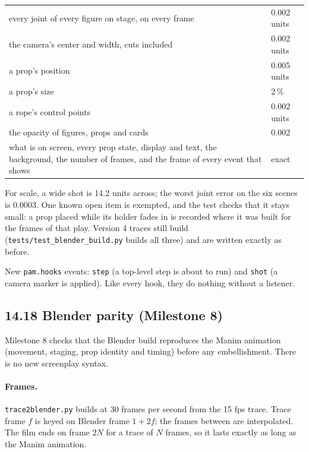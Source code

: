 \documentclass[
  12pt,
  letterpaper,
]{book}
\begin{document}
\begin{center}
\begin{tabular}{p{3.6in}l}
\hline
every joint of every figure on stage, on every frame & 0.002 units \\
the camera's center and width, cuts included & 0.002 units \\
a prop's position & 0.005 units \\
a prop's size & 2\,\% \\
a rope's control points & 0.002 units \\
the opacity of figures, props and cards & 0.002 \\
what is on screen, every prop state, display and text, the background,
the number of frames, and the frame of every event that shows & exact \\
\hline
\end{tabular}
\end{center}

For scale, a wide shot is 14.2 units across; the worst joint error on
the six scenes is 0.0003. One known open item is exempted, and the
test checks that it stays small: a prop placed while its holder fades
in is recorded where it was built for the frames of that play.
Version 4 traces still build (\texttt{tests/test\_blender\_build.py}
builds all three) and are written exactly as before.

New \texttt{pam.hooks} events: \texttt{step} (a top-level step is about
to run) and \texttt{shot} (a camera marker is applied). Like every
hook, they do nothing without a listener.

\subsection{14.18 Blender parity (Milestone
8)}\label{blender-parity}

Milestone 8 checks that the Blender build reproduces the Manim
animation (movement, staging, prop identity and timing) before any
embellishment. There is no new screenplay syntax.

\paragraph{Frames.} \texttt{trace2blender.py} builds at 30 frames per
second from the 15 fps trace. Trace frame $f$ is keyed on Blender frame
$1+2f$; the frames between are interpolated. The film ends on frame
$2N$ for a trace of $N$ frames, so it lasts exactly as long as the
Manim animation.
\end{document}
